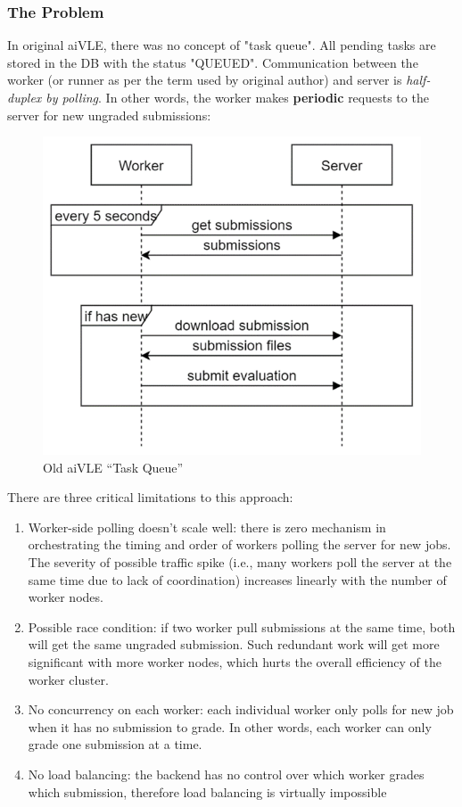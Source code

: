 \documentclass[fyp]{socreport}
\begin{document}
\subsubsection{The Problem}
In original aiVLE, there was no concept of "task queue". All pending tasks are stored in the DB with the status "QUEUED". Communication between the worker (or runner as per the term used by original author) and server is \textit{half-duplex by polling}. In other words, the worker makes \textbf{periodic} requests to the server for new ungraded submissions:
\begin{figure}[H]
    \centering
    \includegraphics{images/aivle-web-old-task-queue.png}
    \caption{Old aiVLE “Task Queue”}
    \label{fig:aivle-web-old-task-queue}
\end{figure}
There are three critical limitations to this approach:
\begin{enumerate}
    \item Worker-side polling doesn't scale well: there is zero mechanism in orchestrating the timing and order of workers polling the server for new jobs. The severity of possible traffic spike (i.e., many workers poll the server at the same time due to lack of coordination) increases linearly with the number of worker nodes.
    \item Possible race condition: if two worker pull submissions at the same time, both will get the same ungraded submission. Such redundant work will get more significant with more worker nodes, which hurts the overall efficiency of the worker cluster.
    \item No concurrency on each worker: each individual worker only polls for new job when it has no submission to grade. In other words, each worker can only grade one submission at a time.
    \item No load balancing: the backend has no control over which worker grades which submission, therefore load balancing is virtually impossible
\end{enumerate}
\end{document}
